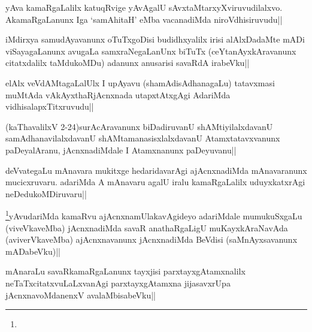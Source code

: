 \begin{artha}
yAva kamaRgaLalilx katuqRvige yAvAgalU sAvxtaMtarxyXviruvudilalxvo. AkamaRgaLanunx Iga `samAhitaH' eMba vacanadiMda niroVdhisiruvudu||
\end{artha}

\begin{artha}
iMdirxya samudAyavanunx oTuTxgoDisi budidhxyalilx irisi alAlxDadaMte mADi viSayagaLanunx avugaLa samxraNegaLanUnx biTuTx (ceYtanAyxkAravanunx citatxdalilx taMdukoMDu) adanunx anusarisi savaRdA irabeVku||
\end{artha}

\begin{artha}
elAlx veVdAMtagaLalUlx I upAyavu (shamAdisAdhanagaLu) tatavxmasi muMtAda vAkAyxthaRjAcnxnada utapxtAtxgAgi AdariMda vidhisalapxTitxruvudu||
\end{artha}


\begin{artha}
(kaThavalilxV 2-24)surAcAravanunx biDadiruvanU shAMtiyilalxdavanU samAdhanavilalxdavanU shAMtamanasisxlalxdavanU Atamxtatavxvanunx paDeyalAranu, jAcnxnadiMdale I Atamxnanunx paDeyuvanu||
\end{artha}


\begin{artha}
deVvategaLu mAnavara mukitxge hedaridavarAgi ajAcnxnadiMda mAnavaranunx mucicxruvaru. adariMda A mAnavaru agalU iralu kamaRgaLalilx uduyxkatxrAgi neDedukoMDiruvaru||
\end{artha}

\begin{artha}
\footnote{}yAvudariMda kamaRvu ajAcnxnamUlakavAgideyo adariMdale mumukuSxgaLu (viveVkaveMba) jAcnxnadiMda savaR anathaRgaLigU muKayxkAraNavAda (aviverVkaveMba) ajAcnxnavanunx jAcnxnadiMda BeVdisi (saMnAyxsavanunx mADabeVku)||
\end{artha}


\begin{artha}
mAnaraLu savaRkamaRgaLanunx tayxjisi parxtayxgAtamxnalilx neTaTxcitatxvuLaLxvanAgi parxtayxgAtamxna jijasavxrUpa jAcnxnavoMdanenxV avalaMbisabeVku||
\end{artha}

